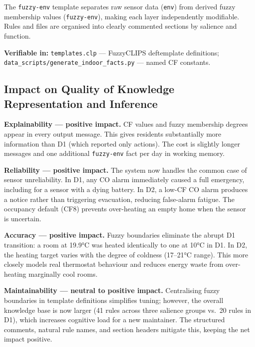 \documentclass{article}
\begin{document}
The \texttt{fuzzy-env} template separates raw sensor data (\texttt{env}) from derived fuzzy membership values (\texttt{fuzzy-env}), making each layer independently modifiable. Rules and files are organised into clearly commented sections by salience and function.

\textbf{Verifiable in:} \texttt{templates.clp} — FuzzyCLIPS deftemplate definitions; \texttt{data\_scripts/generate\_indoor\_facts.py} — named CF constants.

\subsection{Impact on Quality of Knowledge Representation and Inference}

\textbf{Explainability — positive impact.} CF values and fuzzy membership degrees appear in every output message. This gives residents substantially more information than D1 (which reported only actions). The cost is slightly longer messages and one additional \texttt{fuzzy-env} fact per day in working memory.

\textbf{Reliability — positive impact.} The system now handles the common case of sensor unreliability. In D1, any CO alarm immediately caused a full emergency, including for a sensor with a dying battery. In D2, a low-CF CO alarm produces a notice rather than triggering evacuation, reducing false-alarm fatigue. The occupancy default (CF8) prevents over-heating an empty home when the sensor is uncertain.

\textbf{Accuracy — positive impact.} Fuzzy boundaries eliminate the abrupt D1 transition: a room at 19.9°C was heated identically to one at 10°C in D1. In D2, the heating target varies with the degree of coldness (17–21°C range). This more closely models real thermostat behaviour and reduces energy waste from over-heating marginally cool rooms.

\textbf{Maintainability — neutral to positive impact.} Centralising fuzzy boundaries in template definitions simplifies tuning; however, the overall knowledge base is now larger (41 rules across three salience groups vs.\ 20 rules in D1), which increases cognitive load for a new maintainer. The structured comments, natural rule names, and section headers mitigate this, keeping the net impact positive.




\end{document}
